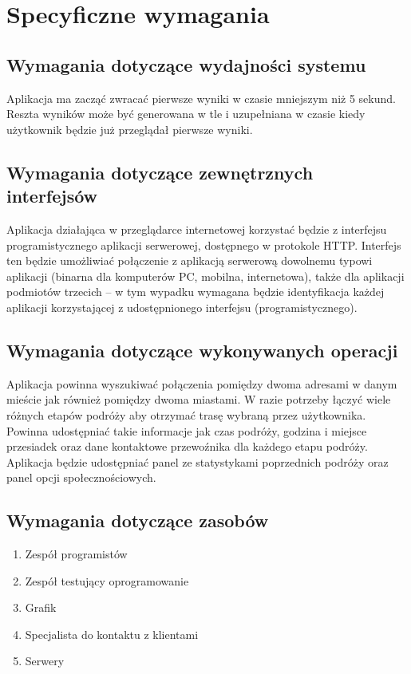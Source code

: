 \documentclass[12pt,a4paper]{report}
\begin{document}
\section{Specyficzne wymagania}
\subsection{Wymagania dotyczące wydajności systemu}
	Aplikacja ma zacząć zwracać pierwsze wyniki w czasie mniejszym niż 5 sekund. Reszta wyników może być generowana w tle i uzupełniana w czasie kiedy użytkownik będzie już przeglądał pierwsze wyniki.
\subsection{Wymagania dotyczące zewnętrznych interfejsów}
Aplikacja działająca w przeglądarce internetowej korzystać będzie z interfejsu programistycznego aplikacji serwerowej, dostępnego w protokole HTTP. Interfejs ten będzie umożliwiać połączenie z aplikacją serwerową dowolnemu typowi aplikacji (binarna dla komputerów PC, mobilna, internetowa), także dla aplikacji podmiotów trzecich -- w tym wypadku wymagana będzie identyfikacja każdej aplikacji korzystającej z udostępnionego interfejsu (programistycznego).
\subsection{Wymagania dotyczące wykonywanych operacji}
	Aplikacja powinna wyszukiwać połączenia pomiędzy dwoma adresami w danym mieście jak również pomiędzy dwoma miastami. W razie potrzeby łączyć wiele różnych etapów podróży aby otrzymać trasę wybraną przez użytkownika. Powinna udostępniać takie informacje jak czas podróży, godzina i miejsce przesiadek oraz dane kontaktowe przewoźnika dla każdego etapu podróży. Aplikacja będzie udostępniać panel ze statystykami poprzednich podróży oraz panel opcji społecznościowych.
\subsection{Wymagania dotyczące zasobów}
\begin{enumerate}
	\item Zespół programistów
	\item Zespół testujący oprogramowanie
	\item Grafik
	\item Specjalista do kontaktu z klientami
	\item Serwery
\end{enumerate}
\end{document}
